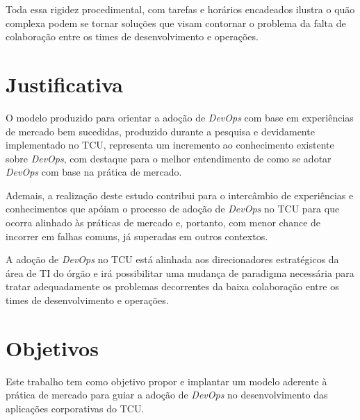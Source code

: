 Toda essa rigidez procedimental, com tarefas e horários encadeados ilustra o
quão complexa podem se tornar soluções que visam contornar o problema da falta
de colaboração entre os times de desenvolvimento e operações.

\section{Justificativa}%

O modelo produzido para orientar a adoção de \textit{DevOps} com base em
experiências de mercado bem sucedidas, produzido durante a pesquisa e
devidamente implementado no \acrshort{TCU}, representa um
incremento ao conhecimento existente sobre \textit{DevOps}, com destaque
para o melhor entendimento de como se adotar \textit{DevOps} com base na
prática de mercado.

Ademais, a realização deste estudo contribui para o intercâmbio de experiências
e conhecimentos que apóiam o processo de adoção de \textit{DevOps} no TCU
para que ocorra alinhado às práticas de mercado e, portanto, com menor
chance de incorrer em falhas comuns, já superadas em outros contextos.

A adoção de \textit{DevOps} no \acrshort{TCU} está alinhada aos direcionadores
estratégicos da área de \acrshort{TI} do órgão e irá possibilitar uma
mudança de paradigma necessária para tratar adequadamente os problemas
decorrentes da baixa colaboração entre os times de desenvolvimento e operações.


\section{Objetivos}
Este trabalho tem como objetivo propor e implantar um modelo aderente à prática
de mercado para guiar a adoção de \textit{DevOps} no desenvolvimento das
aplicações corporativas do \acrshort{TCU}.

